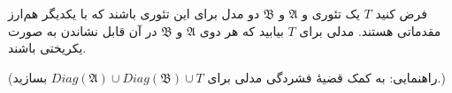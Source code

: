 فرض کنید $T$ یک تئوری و $\mathfrak{A}$ و $\mathfrak{B}$ دو مدل برای این تئوری باشند که با یکدیگر هم‌ارز مقدماتی هستند. مدلی برای $T$ بیابید که هر دوی $\mathfrak{A}$ و $\mathfrak{B}$ در آن قابل نشاندن به صورت یکریختی باشند.

(راهنمایی: به کمک قضیهٔ فشردگی مدلی برای $Diag(\mathfrak{A}) \cup Diag(\mathfrak{B}) \cup T$ بسازید.)